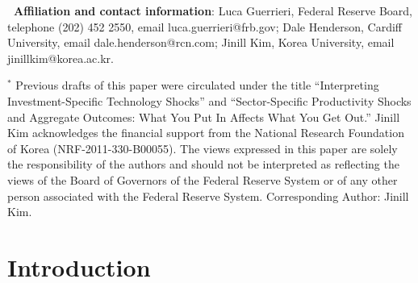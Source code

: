 \documentclass[12pt,fleqn]{article}
\renewcommand{\baselinestretch}{1.5}
\begin{document}
\renewcommand{\baselinestretch}{1} {\footnotesize \noindent }

{\footnotesize \textbf{\ Affiliation and contact information}: Luca
Guerrieri, Federal Reserve Board, telephone (202) 452 2550, email
luca.guerrieri@frb.gov; Dale Henderson, Cardiff University, email
dale.henderson@rcn.com; Jinill Kim, Korea University, email
jinillkim@korea.ac.kr. }

{\footnotesize \vspace{2cm} }

{\footnotesize \noindent $^{*}$ Previous drafts of this paper were
circulated under the title ``Interpreting Investment-Specific Technology
Shocks'' and ``Sector-Specific Productivity Shocks and Aggregate Outcomes: What You Put In Affects What You Get Out.'' 
Jinill Kim acknowledges the financial support from the National Research Foundation of Korea (NRF-2011-330-B00055).
The views expressed in this paper are solely the responsibility of
the authors and should not be interpreted as reflecting the views of the
Board of Governors of the Federal Reserve System or of any other person
associated with the Federal Reserve System. Corresponding Author: Jinill Kim.}

\clearpage \renewcommand{\baselinestretch}{1.5} \normalsize

\section{\protect\normalsize Introduction}
\end{document}
